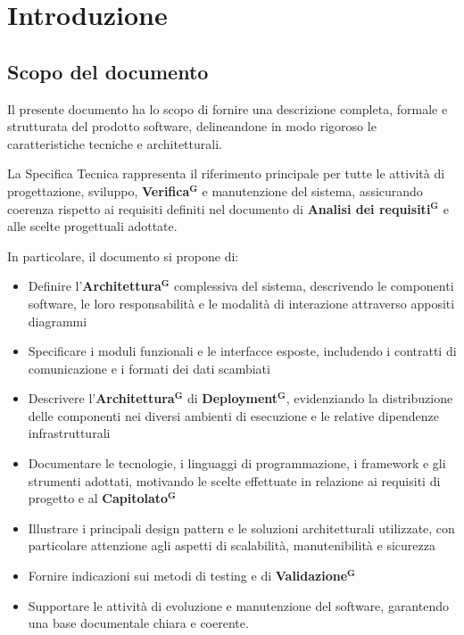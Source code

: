 \documentclass[a4paper,12pt]{article}
\newcommand{\term}[1]{\textbf{#1}$^\mathbf{G}$}
\begin{document}
\clearpage

\tableofcontents
\thispagestyle{empty}

\clearpage

\listoftables

\listoffigures

\clearpage


\section{Introduzione}
\subsection{Scopo del documento} \label{sec:scopo_documento}
Il presente documento ha lo scopo di fornire una descrizione completa, formale e strutturata del prodotto software, delineandone in modo rigoroso le caratteristiche tecniche e architetturali.

La Specifica Tecnica rappresenta il riferimento principale per tutte le attività di progettazione, sviluppo, \term{Verifica} e manutenzione del sistema, assicurando coerenza rispetto ai requisiti definiti nel documento di \term{Analisi dei requisiti} e alle scelte progettuali adottate.

In particolare, il documento si propone di:

\begin{itemize}
    \item Definire l'\term{Architettura} complessiva del sistema, descrivendo le componenti software, le loro responsabilità e le modalità di interazione attraverso appositi diagrammi
    
    \item Specificare i moduli funzionali e le interfacce esposte, includendo i contratti di comunicazione e i formati dei dati scambiati
    
    \item Descrivere l'\term{Architettura} di \term{Deployment}, evidenziando la distribuzione delle componenti nei diversi ambienti di esecuzione e le relative dipendenze infrastrutturali
    
    \item Documentare le tecnologie, i linguaggi di programmazione, i framework e gli strumenti adottati, motivando le scelte effettuate in relazione ai requisiti di progetto e al \term{Capitolato}
    
    \item Illustrare i principali design pattern e le soluzioni architetturali utilizzate, con particolare attenzione agli aspetti di scalabilità, manutenibilità e sicurezza
        
    \item Fornire indicazioni sui metodi di testing e di \term{Validazione}
    
    \item Supportare le attività di evoluzione e manutenzione del software, garantendo una base documentale chiara e coerente.
\end{itemize}
\end{document}
